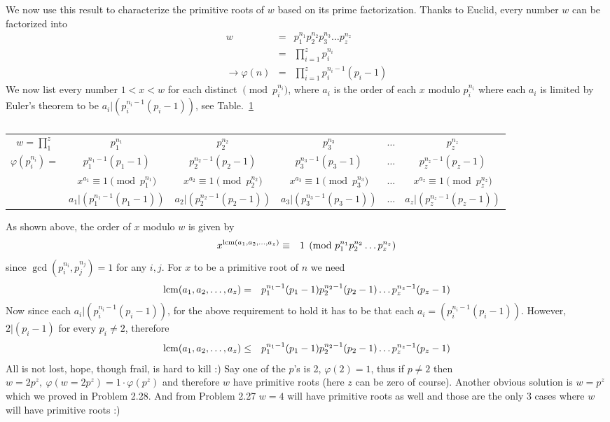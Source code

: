 \documentclass[aps,preprint,preprintnumbers,nofootinbib,showpacs,prd]{revtex4-1}
\newcommand{\nbea}{\begin{eqnarray*}}
\newcommand{\neea}{\end{eqnarray*}}
\begin{document}
We now use this result to characterize the primitive roots of $w$ based on its prime factorization. Thanks to Euclid, every number $w$ can be factorized into
%
\nbea
w & = & p_1^{n_1}p_2^{n_2}p_3^{n_3} \dots p_z^{n_z} \\
& = & \prod_{i=1}^{z} p_i^{n_i} \\
\to \varphi(n) & = & \prod_{i=1}^{z} p_i^{n_i-1}(p_i - 1)
\neea
%
We now list every number $1 < x < w$ for each distinct $\pmod{p_i^{n_i}}$, where $a_i$ is the order of each $x$ modulo $p_i^{n_i}$ where each $a_i$ is limited by Euler's theorem to be $a_i|(p_i^{n_i-1}(p_i-1))$, see Table.~\ref{Tab:2}
%
\begin{table}[]
\centering
\caption{}
\label{Tab:2}
\begin{tabular}{|c|c|c|c c c|}
\hline
$w=\prod_{1}^{z}$ & $p_1^{n_1}$ & $p_2^{n_2}$ & $p_3^{n_3}$ & $\dots$ & $p_z^{n_z}$ \\
$\varphi(p_i^{n_i}) = $ & $p_1^{n_1-1}(p_1-1)$ & $p_2^{n_2-1}(p_2-1)$ & $p_3^{n_3-1}(p_3-1)$ & $\dots$ & $p_z^{n_z-1}(p_z-1)$ \\ \hline 
 & $x^{a_1} \equiv 1 \pmod{p_1^{n_1}}$ & $x^{a_2} \equiv 1 \pmod{p_2^{n_2}}$ & $x^{a_3} \equiv 1 \pmod{p_3^{n_3}}$ & $\dots$ & $x^{a_z} \equiv 1 \pmod{p_z^{n_z}}$ \\
 & $a_1|(p_1^{n_1-1}(p_1-1))$ & $a_2|(p_2^{n_2-1}(p_2-1))$ & $a_3|(p_3^{n_3-1}(p_3-1))$ & $\dots$ & $a_z|(p_z^{n_z-1}(p_z-1))$ \\ \hline
\end{tabular}
\end{table}
%
As shown above, the order of $x$ modulo $w$ is given by
%
\nbea
x^{{\rm lcm}(a_1, a_2, \dots, a_z)} & \equiv & 1 \pmod{p_1^{n_1}p_2^{n_2} \dots p_z^{n_z}}
\neea
%
since $\gcd(p_i^{n_i},p_j^{n_j}) = 1$ for any $i, j$. For $x$ to be a primitive root of $n$ we need
%
\nbea
{\rm lcm}(a_1, a_2, \dots, a_z) & = & p_1^{n_1-1}(p_1 - 1)p_2^{n_2-1}(p_2 - 1) \dots p_z^{n_z-1}(p_z - 1)
\neea
%
Now since each $a_i|(p_i^{n_i-1}(p_i-1))$, for the above requirement to hold it has to be that each $a_i = (p_i^{n_i-1}(p_i-1))$. However, $2|(p_i-1)$ for every $p_i \neq 2$, therefore
%
\nbea
{\rm lcm}(a_1, a_2, \dots, a_z) & \le & p_1^{n_1-1}(p_1 - 1)p_2^{n_2-1}(p_2 - 1) \dots p_z^{n_z-1}(p_z - 1)
\neea
%
All is not lost, hope, though frail, is hard to kill :) Say one of the $p$'s is 2, $\varphi(2)=1$, thus if $p \neq 2$ then $w = 2 p^z, ~\varphi(w=2 p^z) = 1 \cdot \varphi(p^z)$ and therefore $w$ have primitive roots (here $z$ can be zero of course). Another obvious solution is $w=p^z$ which we proved in Problem 2.28. And from Problem 2.27 $w=4$ will have primitive roots as well and those are the only 3 cases where $w$ will have primitive roots :)
\end{document}
